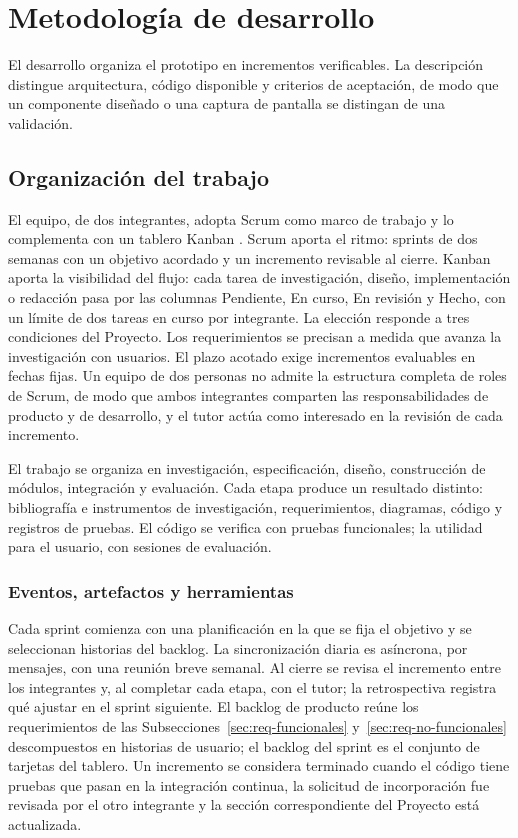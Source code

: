 \chapter{Metodología de desarrollo}\label{chap:metodologia}

El desarrollo organiza el prototipo en incrementos verificables. La descripción distingue arquitectura, código disponible y criterios de aceptación, de modo que un componente diseñado o una captura de pantalla se distingan de una validación.

\section{Organización del trabajo}\label{sec:planificacion}

El equipo, de dos integrantes, adopta Scrum como marco de trabajo y lo complementa con un tablero Kanban \parencite{ScrumGuide2020,Anderson2010}. Scrum aporta el ritmo: sprints de dos semanas con un objetivo acordado y un incremento revisable al cierre. Kanban aporta la visibilidad del flujo: cada tarea de investigación, diseño, implementación o redacción pasa por las columnas Pendiente, En curso, En revisión y Hecho, con un límite de dos tareas en curso por integrante. La elección responde a tres condiciones del Proyecto. Los requerimientos se precisan a medida que avanza la investigación con usuarios. El plazo acotado exige incrementos evaluables en fechas fijas. Un equipo de dos personas no admite la estructura completa de roles de Scrum, de modo que ambos integrantes comparten las responsabilidades de producto y de desarrollo, y el tutor actúa como interesado en la revisión de cada incremento.

El trabajo se organiza en investigación, especificación, diseño, construcción de módulos, integración y evaluación. Cada etapa produce un resultado distinto: bibliografía e instrumentos de investigación, requerimientos, diagramas, código y registros de pruebas. El código se verifica con pruebas funcionales; la utilidad para el usuario, con sesiones de evaluación.

\subsection{Eventos, artefactos y herramientas}\label{subsec:scrum-eventos}

Cada sprint comienza con una planificación en la que se fija el objetivo y se seleccionan historias del backlog. La sincronización diaria es asíncrona, por mensajes, con una reunión breve semanal. Al cierre se revisa el incremento entre los integrantes y, al completar cada etapa, con el tutor; la retrospectiva registra qué ajustar en el sprint siguiente. El backlog de producto reúne los requerimientos de las Subsecciones~\ref{sec:req-funcionales} y~\ref{sec:req-no-funcionales} descompuestos en historias de usuario; el backlog del sprint es el conjunto de tarjetas del tablero. Un incremento se considera terminado cuando el código tiene pruebas que pasan en la integración continua, la solicitud de incorporación fue revisada por el otro integrante y la sección correspondiente del Proyecto está actualizada.

